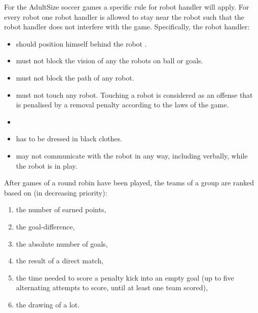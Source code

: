 \bigskip

For the AdultSize soccer games a specific rule for robot handler will apply. For every robot one robot handler is allowed to stay near the robot such that the robot handler does not interfere with the game. Specifically, the robot handler:
\begin{itemize}
\item should position himself behind the robot  .
\item must not block the vision of any the robots on ball or goals.
\item must not block the path of any robot.
\item must not touch any robot. Touching a robot is considered as an offense that is penalised by a removal penalty according to the laws of the game.
\item {}
\item has to be dressed in black clothes.
\item may not communicate with the robot in any way, including verbally, while the robot is in play.
\end{itemize}
\color{black}

\bigskip

After games of a round robin have been played, the teams of a group are ranked based on (in decreasing priority): 

\begin{enumerate}
\item the number of earned points,
\item the goal-difference,
\item the absolute number of goals,
\item the result of a direct match,
\item the time needed to score a penalty kick into an empty goal (up to five alternating attempts to score, until at least one team scored),
\item the drawing of a lot.
\end{enumerate}

\bigskip

